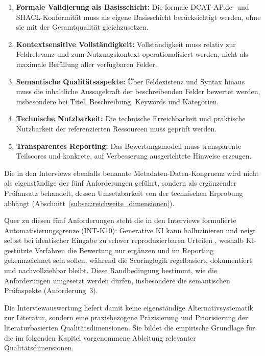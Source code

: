 \begin{enumerate}
    \item \textbf{Formale Validierung als Basisschicht:} Die formale DCAT-AP.de- und SHACL-Konformität muss als eigene Basisschicht berücksichtigt werden, ohne sie mit der Gesamtqualität gleichzusetzen.
    \item \textbf{Kontextsensitive Vollständigkeit:} Vollständigkeit muss relativ zur Feldrelevanz und zum Nutzungskontext operationalisiert werden, nicht als maximale Befüllung aller verfügbaren Felder.
    \item \textbf{Semantische Qualitätsaspekte:} Über Feldexistenz und Syntax hinaus muss die inhaltliche Aussagekraft der beschreibenden Felder bewertet werden, insbesondere bei Titel, Beschreibung, Keywords und Kategorien.
    \item \textbf{Technische Nutzbarkeit:} Die technische Erreichbarkeit und praktische Nutzbarkeit der referenzierten Ressourcen muss geprüft werden.
    \item \textbf{Transparentes Reporting:} Das Bewertungsmodell muss transparente Teilscores und konkrete, auf Verbesserung ausgerichtete Hinweise erzeugen.
\end{enumerate}

Die in den Interviews ebenfalls benannte Metadaten-Daten-Kongruenz wird nicht als eigenständige der fünf Anforderungen geführt, sondern als ergänzender Prüfansatz behandelt, dessen Umsetzbarkeit von der technischen Erprobung abhängt (Abschnitt~\ref{subsec:reichweite_dimensionen}).

Quer zu diesen fünf Anforderungen steht die in den Interviews formulierte Automatisierungsgrenze (INT-K10): Generative KI kann halluzinieren \cite{Ji2023HallucinationSurvey} und neigt selbst bei identischer Eingabe zu schwer reproduzierbaren Urteilen \cite{Zheng2023LLMJudge}, weshalb KI-gestützte Verfahren die Bewertung nur ergänzen und im Reporting gekennzeichnet sein sollen, während die Scoringlogik regelbasiert, dokumentiert und nachvollziehbar bleibt. Diese Randbedingung bestimmt, wie die Anforderungen umgesetzt werden dürfen, insbesondere die semantischen Prüfaspekte (Anforderung~3).

Die Interviewauswertung liefert damit keine eigenständige Alternativsystematik zur Literatur, sondern eine praxisbezogene Präzisierung und Priorisierung der literaturbasierten Qualitätsdimensionen. Sie bildet die empirische Grundlage für die im folgenden Kapitel vorgenommene Ableitung relevanter Qualitätsdimensionen.

